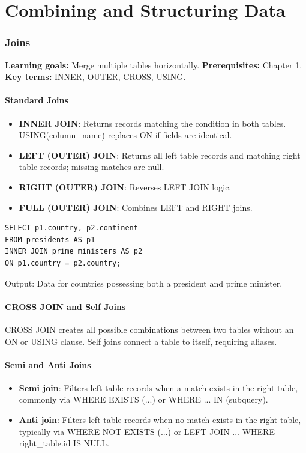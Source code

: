 \documentclass[12pt, a4paper]{article}
\begin{document}
\part{Combining and Structuring Data}

\section{Joins}
\textbf{Learning goals:} Merge multiple tables horizontally.
\textbf{Prerequisites:} Chapter 1.
\textbf{Key terms:} INNER, OUTER, CROSS, USING.

\subsection{Standard Joins}
\begin{itemize}
    \item \textbf{INNER JOIN}: Returns records matching the condition in both tables. USING(column\_name) replaces ON if fields are identical.
    \item \textbf{LEFT (OUTER) JOIN}: Returns all left table records and matching right table records; missing matches are null.
    \item \textbf{RIGHT (OUTER) JOIN}: Reverses LEFT JOIN logic.
    \item \textbf{FULL (OUTER) JOIN}: Combines LEFT and RIGHT joins.
\end{itemize}

\begin{verbatim}
SELECT p1.country, p2.continent 
FROM presidents AS p1 
INNER JOIN prime_ministers AS p2 
ON p1.country = p2.country;
\end{verbatim}
Output: Data for countries possessing both a president and prime minister.

\subsection{CROSS JOIN and Self Joins}
CROSS JOIN creates all possible combinations between two tables without an ON or USING clause. Self joins connect a table to itself, requiring aliases.

\subsection{Semi and Anti Joins}
\begin{itemize}
    \item \textbf{Semi join}: Filters left table records when a match exists in the right table, commonly via WHERE EXISTS (...) or WHERE ... IN (subquery).
    \item \textbf{Anti join}: Filters left table records when no match exists in the right table, typically via WHERE NOT EXISTS (...) or LEFT JOIN ... WHERE right\_table.id IS NULL.
\end{itemize}
\end{document}
